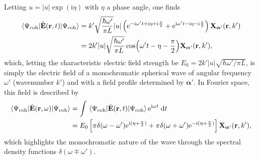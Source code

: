 \documentclass{article}
\numberwithin{equation}{section}
\begin{document}
Letting $u = |u|\exp(\mathrm{i}\eta)$ with $\eta$ a phase angle, one finds
\begin{equation}
\begin{split}
\mel{\Psi_\mathrm{coh}}{\hat{\mathbf{E}}(\mathbf{r},t)}{\Psi_\mathrm{coh}} &= k'\sqrt{\frac{\hbar\omega'}{\pi L}}|u|\left(\mathrm{e}^{-\mathrm{i}\omega't + \mathrm{i}\eta + \mathrm{i}\frac{\pi}{2}} + \mathrm{e}^{\mathrm{i}\omega't - \mathrm{i}\eta - \mathrm{i}\frac{\pi}{2}}\right)\mathbf{X}_{\bm{\alpha}'}(\mathbf{r},k')\\
&= 2k'|u|\sqrt{\frac{\hbar\omega'}{\pi L}}\cos(\omega't - \eta - \frac{\pi}{2})\mathbf{X}_{\bm{\alpha}'}(\mathbf{r},k'),
\end{split}
\end{equation}
which, letting the characteristic electric field strength be $E_0 = 2k'|u|\sqrt{\hbar \omega'/\pi L}$, is simply the electric field of a monochromatic spherical wave of angular frequency $\omega'$ (wavenumber $k'$) and with a field profile determined by $\bm{\alpha}'$. In Fourier space, this field is described by
\begin{equation}
\begin{split}
\mel{\Psi_\mathrm{coh}}{\hat{\mathbf{E}}(\mathbf{r},\omega)}{\Psi_\mathrm{coh}} &= \int \mel{\Psi_\mathrm{coh}}{\hat{\mathbf{E}}(\mathbf{r},t)}{\Psi_\mathrm{coh}}\mathrm{e}^{\mathrm{i}\omega t}\;\mathrm{d}t\\
&= E_0\left[\pi\delta(\omega - \omega')\mathrm{e}^{\mathrm{i}(\eta + \frac{\pi}{2})} + \pi\delta(\omega + \omega')\mathrm{e}^{\mathrm{-i}(\eta + \frac{\pi}{2})}\right]\mathbf{X}_{\bm{\alpha}'}(\mathbf{r},k'),
\end{split}
\end{equation}
which highlights the monochromatic nature of the wave through the spectral density functions $\delta(\omega\mp\omega')$.
























\newpage
\appendix

\renewcommand{\theequation}{\thesection.\arabic{equation}}
\end{document}
